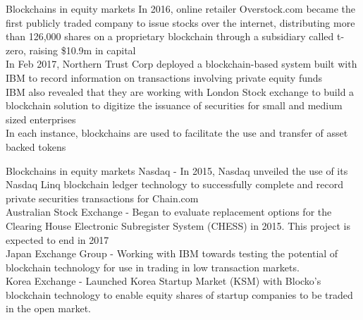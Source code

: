 \documentclass[11pt]{beamer}
\begin{document}

\begin{frame}{Blockchains in equity markets}
	In 2016, online retailer Overstock.com became the first publicly traded company to issue stocks over the internet, distributing more than 126,000 shares on a proprietary blockchain through a subsidiary called t-zero, raising \$10.9m in capital\\ \vspace{3mm}
	In Feb 2017, Northern Trust Corp deployed a blockchain-based system built with IBM to record information on transactions involving private equity funds \\ \vspace{3mm}
	IBM also revealed that they are working with London Stock exchange to build a blockchain solution to digitize the issuance of securities for small and medium sized enterprises\\ \vspace{3mm}
	In each instance, blockchains are used to facilitate the use and transfer of asset backed tokens
\end{frame}



\begin{frame}{Blockchains in equity markets}
	Nasdaq - In 2015, Nasdaq unveiled the use of its Nasdaq Linq blockchain ledger technology to successfully complete and record private securities transactions for Chain.com\\ \vspace{3mm}
	Australian Stock Exchange - Began to evaluate replacement options for the Clearing House Electronic Subregister System (CHESS) in 2015. This project is expected to end in 2017\\ \vspace{3mm}
	Japan Exchange Group - Working with IBM towards testing the potential of blockchain technology for use in trading in low transaction markets.\\ \vspace{3mm}
	Korea Exchange -  Launched Korea Startup Market (KSM) with Blocko's blockchain technology to enable equity shares of startup companies to be traded in the open market.\\ \vspace{3mm}
\end{frame}
\end{document}

